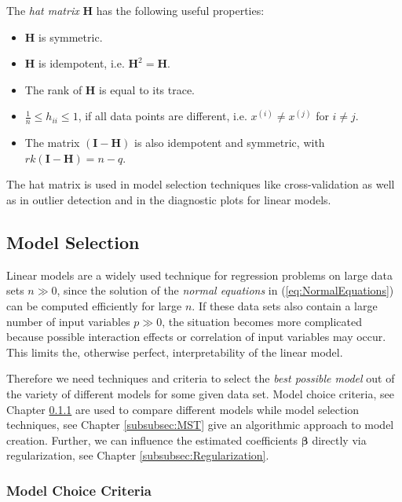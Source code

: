 \documentclass[10pt,a4paper]{article}
\begin{document}
The \emph{hat matrix} $\boldsymbol{H}$ has the following useful properties:

\begin{itemize}
	\item $\boldsymbol{H}$ is symmetric.
	\item $\boldsymbol{H}$ is idempotent, i.e. $\boldsymbol{H}^2 = \boldsymbol{H}$.
	\item The rank of $\boldsymbol{H}$ is equal to its trace.
	\item $\frac{1}{n} \le h_{ii} \le 1$, if all data points are different, i.e. $x^{(i)} \ne x^{(j)}$ for $i \ne j$.
	\item The matrix $(\boldsymbol{I} - \boldsymbol{H})$ is also idempotent and symmetric, with $rk(\boldsymbol{I} - \boldsymbol{H}) = n - q$.
\end{itemize}

The hat matrix is used in model selection techniques like cross-validation as well as in outlier detection and in the diagnostic plots for linear models.

\subsection{Model Selection}

Linear models are a widely used technique for regression problems on large data sets $n \gg 0$, since the solution of the \emph{normal equations} in (\ref{eq:NormalEquations}) can be computed efficiently for large $n$. If these data sets also contain a large number of input variables $p \gg 0$, the situation becomes more complicated because possible interaction effects or correlation of input variables may occur. This limits the, otherwise perfect, interpretability of the linear model. 

Therefore we need techniques and criteria to select the \emph{best possible model} out of the variety of different models for some given data set. Model choice criteria, see Chapter \ref{subsubsec:MCC} are used to compare different models while model selection techniques, see Chapter \ref{subsubsec:MST} give an algorithmic approach to model creation. Further, we can influence the estimated coefficients $\boldsymbol{\beta}$ directly via regularization, see Chapter \ref{subsubsec:Regularization}. 

\subsubsection{Model Choice Criteria} \label{subsubsec:MCC}
\end{document}

